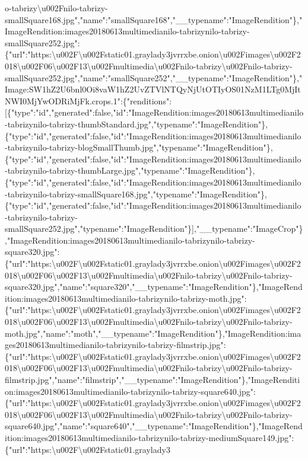 o-tabrizy\textbackslash{}u002Fnilo-tabrizy-smallSquare168.jpg","name":"smallSquare168","\_\_typename":"ImageRendition"\},"ImageRendition:images20180613multimedianilo-tabrizynilo-tabrizy-smallSquare252.jpg":\{"url":"https:\textbackslash{}u002F\textbackslash{}u002Fstatic01.graylady3jvrrxbe.onion\textbackslash{}u002Fimages\textbackslash{}u002F2018\textbackslash{}u002F06\textbackslash{}u002F13\textbackslash{}u002Fmultimedia\textbackslash{}u002Fnilo-tabrizy\textbackslash{}u002Fnilo-tabrizy-smallSquare252.jpg","name":"smallSquare252","\_\_typename":"ImageRendition"\},"Image:SW1hZ2U6bnl0Oi8vaW1hZ2UvZTVlNTQyNjUtOTIyOS01NzM1LTg0MjItNWI0MjYwODRiMjFk.crops.1":\{"renditions":{[}\{"type":"id","generated":false,"id":"ImageRendition:images20180613multimedianilo-tabrizynilo-tabrizy-thumbStandard.jpg","typename":"ImageRendition"\},\{"type":"id","generated":false,"id":"ImageRendition:images20180613multimedianilo-tabrizynilo-tabrizy-blogSmallThumb.jpg","typename":"ImageRendition"\},\{"type":"id","generated":false,"id":"ImageRendition:images20180613multimedianilo-tabrizynilo-tabrizy-thumbLarge.jpg","typename":"ImageRendition"\},\{"type":"id","generated":false,"id":"ImageRendition:images20180613multimedianilo-tabrizynilo-tabrizy-smallSquare168.jpg","typename":"ImageRendition"\},\{"type":"id","generated":false,"id":"ImageRendition:images20180613multimedianilo-tabrizynilo-tabrizy-smallSquare252.jpg","typename":"ImageRendition"\}{]},"\_\_typename":"ImageCrop"\},"ImageRendition:images20180613multimedianilo-tabrizynilo-tabrizy-square320.jpg":\{"url":"https:\textbackslash{}u002F\textbackslash{}u002Fstatic01.graylady3jvrrxbe.onion\textbackslash{}u002Fimages\textbackslash{}u002F2018\textbackslash{}u002F06\textbackslash{}u002F13\textbackslash{}u002Fmultimedia\textbackslash{}u002Fnilo-tabrizy\textbackslash{}u002Fnilo-tabrizy-square320.jpg","name":"square320","\_\_typename":"ImageRendition"\},"ImageRendition:images20180613multimedianilo-tabrizynilo-tabrizy-moth.jpg":\{"url":"https:\textbackslash{}u002F\textbackslash{}u002Fstatic01.graylady3jvrrxbe.onion\textbackslash{}u002Fimages\textbackslash{}u002F2018\textbackslash{}u002F06\textbackslash{}u002F13\textbackslash{}u002Fmultimedia\textbackslash{}u002Fnilo-tabrizy\textbackslash{}u002Fnilo-tabrizy-moth.jpg","name":"moth","\_\_typename":"ImageRendition"\},"ImageRendition:images20180613multimedianilo-tabrizynilo-tabrizy-filmstrip.jpg":\{"url":"https:\textbackslash{}u002F\textbackslash{}u002Fstatic01.graylady3jvrrxbe.onion\textbackslash{}u002Fimages\textbackslash{}u002F2018\textbackslash{}u002F06\textbackslash{}u002F13\textbackslash{}u002Fmultimedia\textbackslash{}u002Fnilo-tabrizy\textbackslash{}u002Fnilo-tabrizy-filmstrip.jpg","name":"filmstrip","\_\_typename":"ImageRendition"\},"ImageRendition:images20180613multimedianilo-tabrizynilo-tabrizy-square640.jpg":\{"url":"https:\textbackslash{}u002F\textbackslash{}u002Fstatic01.graylady3jvrrxbe.onion\textbackslash{}u002Fimages\textbackslash{}u002F2018\textbackslash{}u002F06\textbackslash{}u002F13\textbackslash{}u002Fmultimedia\textbackslash{}u002Fnilo-tabrizy\textbackslash{}u002Fnilo-tabrizy-square640.jpg","name":"square640","\_\_typename":"ImageRendition"\},"ImageRendition:images20180613multimedianilo-tabrizynilo-tabrizy-mediumSquare149.jpg":\{"url":"https:\textbackslash{}u002F\textbackslash{}u002Fstatic01.graylady3